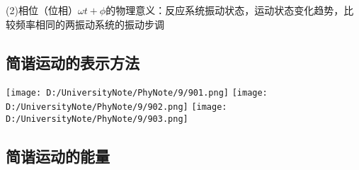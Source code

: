 \documentclass[UTF8]{article}
\begin{document}
    (2)相位（位相）$\omega t + \phi$的物理意义：反应系统振动状态，运动状态变化趋势，比较频率相同的两振动系统的振动步调

\subsection{简谐运动的表示方法}

    \texttt{[image: D:/UniversityNote/PhyNote/9/901.png]}
    \texttt{[image: D:/UniversityNote/PhyNote/9/902.png]}
    \texttt{[image: D:/UniversityNote/PhyNote/9/903.png]}

\subsection{简谐运动的能量}
\end{document}
